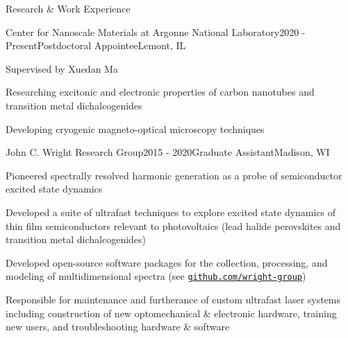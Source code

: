 \documentclass{resume} %
\begin{document}
\begin{rSection}{Research \& Work Experience}
	
\begin{rSubsection}{Center for Nanoscale Materials at Argonne National Laboratory}{2020 - Present}{Postdoctoral Appointee}{Lemont, IL}
	\item Supervised by Xuedan Ma
	\item Researching excitonic and electronic properties of carbon nanotubes and  transition metal dichalcogenides
	\item Developing cryogenic magneto-optical microscopy techniques	
\end{rSubsection}

\begin{rSubsection}{John C. Wright Research Group}{2015 - 2020}{Graduate Assistant}{Madison, WI}
\item Pioneered spectrally resolved harmonic generation as a probe of semiconductor excited state dynamics
\item Developed a suite of ultrafast techniques to explore excited state dynamics of thin film semiconductors relevant to photovoltaics (lead halide perovskites and transition metal dichalcogenides)%
\item Developed open-source software packages for the  collection, processing, and modeling of multidimensional spectra (see \href{http://github.com/wright-group}{\texttt{github.com/wright-group}})
\item Responsible for maintenance and furtherance of custom ultrafast laser systems including construction of new optomechanical \& electronic hardware, training new users, and troubleshooting hardware \& software

\end{rSubsection}


\end{rSection}
\end{document}
